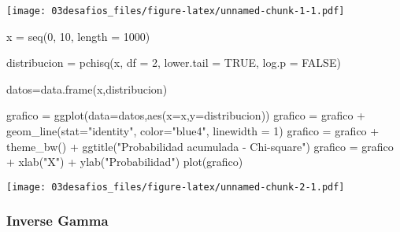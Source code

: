 \documentclass[
]{article}
\newenvironment{Shaded}{\begin{snugshade}}{\end{snugshade}}
\newcommand{\AttributeTok}[1]{\textcolor[rgb]{0.77,0.63,0.00}{#1}}
\newcommand{\ConstantTok}[1]{\textcolor[rgb]{0.00,0.00,0.00}{#1}}
\newcommand{\DecValTok}[1]{\textcolor[rgb]{0.00,0.00,0.81}{#1}}
\newcommand{\FunctionTok}[1]{\textcolor[rgb]{0.00,0.00,0.00}{#1}}
\newcommand{\NormalTok}[1]{#1}
\newcommand{\OtherTok}[1]{\textcolor[rgb]{0.56,0.35,0.01}{#1}}
\newcommand{\SpecialCharTok}[1]{\textcolor[rgb]{0.00,0.00,0.00}{#1}}
\newcommand{\StringTok}[1]{\textcolor[rgb]{0.31,0.60,0.02}{#1}}
\begin{document}
\texttt{[image: 03desafios\_files/figure-latex/unnamed-chunk-1-1.pdf]}

\begin{Shaded}
\begin{Highlighting}[]
\NormalTok{x }\OtherTok{=} \FunctionTok{seq}\NormalTok{(}\DecValTok{0}\NormalTok{, }\DecValTok{10}\NormalTok{, }\AttributeTok{length =} \DecValTok{1000}\NormalTok{)}

\NormalTok{distribucion }\OtherTok{=} \FunctionTok{pchisq}\NormalTok{(x, }\AttributeTok{df =} \DecValTok{2}\NormalTok{, }\AttributeTok{lower.tail =} \ConstantTok{TRUE}\NormalTok{, }\AttributeTok{log.p =} \ConstantTok{FALSE}\NormalTok{)}

\NormalTok{datos}\OtherTok{=}\FunctionTok{data.frame}\NormalTok{(x,distribucion)}

\NormalTok{grafico }\OtherTok{=} \FunctionTok{ggplot}\NormalTok{(}\AttributeTok{data=}\NormalTok{datos,}\FunctionTok{aes}\NormalTok{(}\AttributeTok{x=}\NormalTok{x,}\AttributeTok{y=}\NormalTok{distribucion))}
\NormalTok{grafico }\OtherTok{=}\NormalTok{ grafico }\SpecialCharTok{+} \FunctionTok{geom\_line}\NormalTok{(}\AttributeTok{stat=}\StringTok{"identity"}\NormalTok{, }\AttributeTok{color=}\StringTok{"blue4"}\NormalTok{, }\AttributeTok{linewidth =} \DecValTok{1}\NormalTok{)}
\NormalTok{grafico }\OtherTok{=}\NormalTok{ grafico }\SpecialCharTok{+} \FunctionTok{theme\_bw}\NormalTok{() }\SpecialCharTok{+} \FunctionTok{ggtitle}\NormalTok{(}\StringTok{"Probabilidad acumulada {-} Chi{-}square"}\NormalTok{)}
\NormalTok{grafico }\OtherTok{=}\NormalTok{ grafico }\SpecialCharTok{+} \FunctionTok{xlab}\NormalTok{(}\StringTok{"X"}\NormalTok{) }\SpecialCharTok{+} \FunctionTok{ylab}\NormalTok{(}\StringTok{"Probabilidad"}\NormalTok{)}
\FunctionTok{plot}\NormalTok{(grafico)}
\end{Highlighting}
\end{Shaded}

\texttt{[image: 03desafios\_files/figure-latex/unnamed-chunk-2-1.pdf]}

\hypertarget{inverse-gamma-1}{%
\subsubsection{Inverse Gamma}\label{inverse-gamma-1}}
\end{document}
